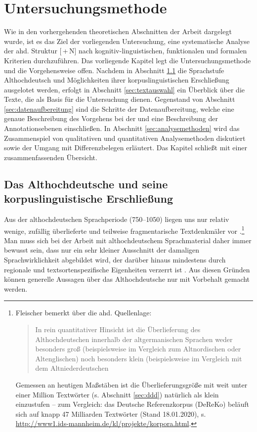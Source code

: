 \chapter{Untersuchungsmethode}\label{methode}

Wie in den vorhergehenden theoretischen Abschnitten der Arbeit dargelegt wurde, ist es das Ziel der vorliegenden Untersuchung, eine systematische Analyse der ahd. Struktur [\,+\,N] nach  kognitiv-linguistischen, funktionalen und formalen Kriterien durchzuführen. Das vorliegende Kapitel legt die Untersuchungsmethode und die Vorgehensweise offen. Nachdem in Abschnitt \ref{sec:ahd} die Sprachstufe Althochdeutsch und Möglichkeiten ihrer korpuslinguistischen   Erschließung ausgelotet werden, erfolgt in Abschnitt \ref{sec:textauswahl} ein Überblick über die Texte, die als Basis für die Untersuchung dienen. Gegenstand von Abschnitt \ref{sec:datenaufbereitung} sind die Schritte der Datenaufbereitung, welche eine genaue Beschreibung des Vorgehens bei der  und eine Beschreibung der Annotationsebenen  einschließen. In Abschnitt \ref{sec:analysemethoden} wird das Zusammenspiel von qualitativen und quantitativen Analysemethoden diskutiert sowie der Umgang mit Differenzbelegen  erläutert. Das Kapitel schließt mit einer zusammenfassenden Übersicht. 

\section{Das Althochdeutsche und seine korpuslinguistische Erschließung}\label{sec:ahd}

Aus der althochdeutschen Sprachperiode (750--1050) liegen uns nur relativ wenige, zufällig überlieferte und teilweise fragmentarische Textdenkmäler vor \parencite[zur Überlieferungsproblematik s. ausführlich][49--105]{Sonderegger2003}.\footnote{Fleischer bemerkt über die ahd. Quellenlage: \blockcquote[27]{Fleischer2006}{In rein quantitativer Hinsicht ist die Überlieferung des Althochdeutschen innerhalb der altgermanischen Sprachen weder besonders groß (beispielsweise im Vergleich zum Altnordischen oder Altenglischen) noch besonders  klein (beispielsweise im Vergleich mit dem Altniederdeutschen}. Gemessen an heutigen Maßstäben ist die Überlieferungsgröße mit weit unter einer Million Textwörter (s. Abschnitt \ref{sec:ddd}) natürlich als klein einzustufen -- zum Vergleich: das Deutsche Referenzkorpus  (DeReKo) beläuft sich auf knapp 47 Milliarden Textwörter (Stand 18.01.2020), s. \url{http://www1.ids-mannheim.de/kl/projekte/korpora.html}.} Man muss sich bei der Arbeit mit althochdeutschem Sprachmaterial daher immer bewusst sein, dass  nur ein sehr kleiner Ausschnitt der damaligen Sprachwirklichkeit abgebildet wird, der darüber hinaus mindestens durch regionale und textsortenspezifische Eigenheiten verzerrt ist  \parencite[27--31]{Fleischer2006}. Aus diesen Gründen können generelle Aussagen über das Althochdeutsche nur mit Vorbehalt gemacht werden. 

